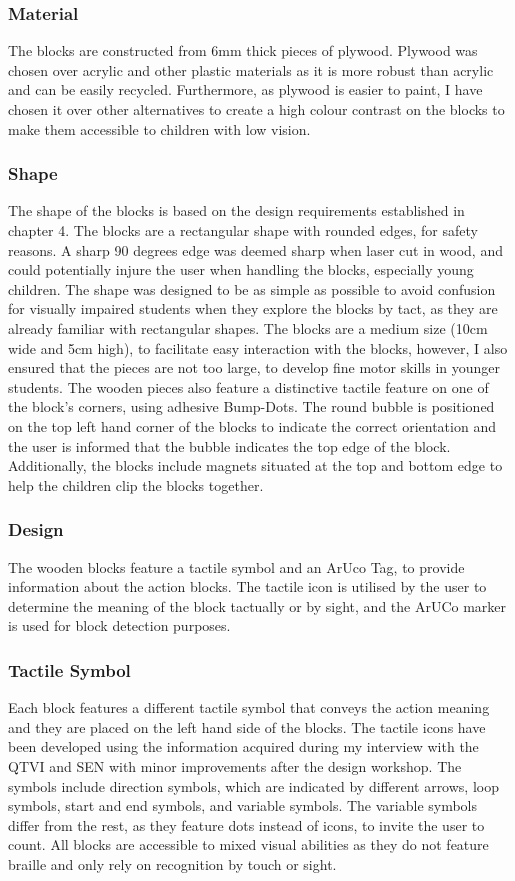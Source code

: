 \documentclass[oneside,%
                    author={Malak Hajji},
                    degree={BSc},
                    title={Designing An Accessible Computational Toolkit For Students},
                  subtitle={With Mixed Visual Abilities}]{dissertation}
\begin{document}
\subsubsection{Material}
The blocks are constructed from 6mm thick pieces of plywood. Plywood was chosen over acrylic and other plastic materials as it is more robust than acrylic and can be easily recycled. Furthermore, as plywood is easier to paint, I have chosen it over other alternatives to create a high colour contrast on the blocks to make them accessible to children with low vision.
\subsubsection{Shape}
The shape of the blocks is based on the design requirements established in chapter 4. The blocks are a rectangular shape with rounded edges, for safety reasons. A sharp 90 degrees edge was deemed sharp when laser cut in wood, and could potentially injure the user when handling the blocks, especially young children. The shape was designed to be as simple as possible to avoid confusion for visually impaired students when they explore the blocks by tact, as they are already familiar with rectangular shapes. The blocks are a medium size (10cm wide and 5cm high), to facilitate easy interaction with the blocks, however, I also ensured that the pieces are not too large, to develop fine motor skills in younger students. The wooden pieces also feature a distinctive tactile feature on one of the block’s corners, using adhesive Bump-Dots. The round bubble is positioned on the top left hand corner of the blocks to indicate the correct orientation and the user is informed that the bubble indicates the top edge of the block. Additionally, the blocks include magnets situated at the top and bottom edge to help the children clip the blocks together.

\subsubsection{Design}
The wooden blocks feature a tactile symbol and an ArUco Tag, to provide information about the action blocks. The tactile icon is utilised by the user to determine the meaning of the block tactually or by sight, and the ArUCo marker is used for block detection purposes. 
\subsubsection{Tactile Symbol}
Each block features a different tactile symbol that conveys the action meaning and they are placed on the left hand side of the blocks. The tactile icons have been developed using the information acquired during my interview with the QTVI and SEN with minor improvements after the design workshop. The symbols include direction symbols, which are indicated by different arrows, loop symbols, start and end symbols, and variable symbols. The variable symbols differ from the rest, as they feature dots instead of icons, to invite the user to count.  All blocks are accessible to mixed visual abilities as they do not feature braille and only rely on recognition by touch or sight.
\end{document}

